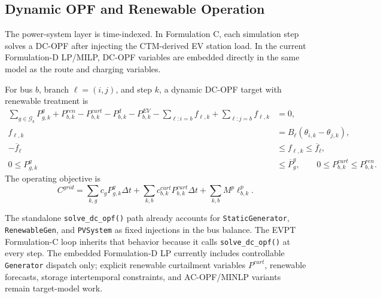 \subsection{Dynamic OPF and Renewable Operation}
\label{sec:evpt-power-coupling}

The power-system layer is time-indexed. In Formulation C, each simulation step
solves a DC-OPF after injecting the CTM-derived EV station load. In the current
Formulation-D LP/MILP, DC-OPF variables are embedded directly in the same model
as the route and charging variables.

For bus \(b\), branch \(\ell=(i,j)\), and step \(k\), a dynamic DC-OPF target
with renewable treatment is
\begin{align}
  \sum_{g\in\mathcal{G}_b} P^g_{g,k}
  + P^{ren}_{b,k}-P^{curt}_{b,k}
  - P^d_{b,k}-P^{EV}_{b,k}
  - \sum_{\ell:i=b} f_{\ell,k}
  + \sum_{\ell:j=b} f_{\ell,k}
  &=0,
  \label{eq:evpt-dopf-balance} \\
  f_{\ell,k} &= B_{\ell}\left(\theta_{i,k}-\theta_{j,k}\right),
  \label{eq:evpt-dopf-flow} \\
  -\overline f_{\ell} &\le f_{\ell,k}\le \overline f_{\ell},
  \label{eq:evpt-dopf-branch} \\
  0\le P^g_{g,k}&\le \overline P^g_g,
  \qquad 0\le P^{curt}_{b,k}\le P^{ren}_{b,k}.
  \label{eq:evpt-dopf-renew}
\end{align}
The operating objective is
\begin{equation}
  C^{grid}=\sum_{k,g} c_g P^g_{g,k}\Delta t
  +\sum_{k,b} c^{curt}_{b,k}P^{curt}_{b,k}\Delta t
  +\sum_{k,b} M^p \ell^p_{b,k}.
  \label{eq:evpt-dopf-obj}
\end{equation}

\begin{remark}
  The standalone \texttt{solve\_dc\_opf()} path already accounts for
  \texttt{StaticGenerator}, \texttt{RenewableGen}, and \texttt{PVSystem} as
  fixed injections in the bus balance. The EVPT Formulation-C loop inherits
  that behavior because it calls \texttt{solve\_dc\_opf()} at every step. The
  embedded Formulation-D LP currently includes controllable \texttt{Generator}
  dispatch only; explicit renewable curtailment variables \(P^{curt}\),
  renewable forecasts, storage intertemporal constraints, and AC-OPF/MINLP
  variants remain target-model work.
\end{remark}

